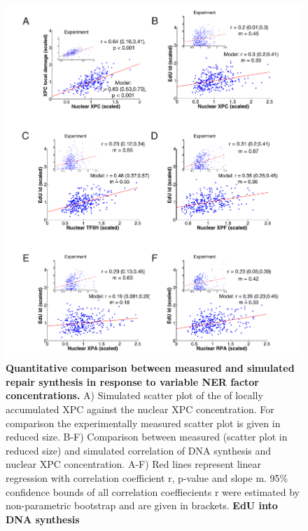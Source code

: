 \begin{figure}[htbp]
	\begin{center}
		\includegraphics[width=1\textwidth]{Abbildungen/figure3_6.pdf}
		\caption{\textbf{Quantitative comparison between measured and simulated repair synthesis in response to variable NER factor concentrations.} A) Simulated scatter plot of the of locally accumulated XPC against the nuclear XPC concentration. For comparison the experimentally measured scatter plot is given in reduced size.  B-F) Comparison between measured (scatter plot in reduced size) and simulated correlation of DNA synthesis and nuclear XPC concentration. A-F) Red lines represent linear regression with correlation coefficient r, p-value and slope m. 95\% confidence bounds of all correlation coeffiecients r were estimated by non-parametric bootstrap and are given in brackets. \textbf{EdU into DNA synthesis}}
		\label{fig:Model_dataComp}
	\end{center}
\end{figure}

